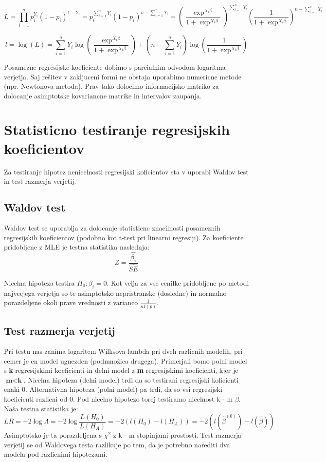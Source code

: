 \documentclass[letterpaper,11pt]{article}
\begin{document}
$$L = \prod_{i=1}^n p_i^{Y_i}(1-p_i)^{1-Y_i}=p_i^{\sum_{i=1}^n Y_i}(1-p_i)^{n-\sum_{i=1}^n Y_i} = 
(\frac{\exp^{X_i \beta}}{1+\exp^{X_i \beta}})^{\sum_{i=1}^n Y_i}(\frac{1}{1+\exp^{X_i \beta}})^{n-\sum_{i=1}^n Y_i}$$

$$l = \log{(L)} = \sum_{i=1}^n Y_i \log{(\frac{\exp^{X_i \beta}}{1+\exp^{X_i \beta}})} + (n-\sum_{i=1}^n Y_i)\log{(\frac{1}{1+\exp^{X_i \beta}})}$$

\noindent Posamezne regresijske koeficiente dobimo s parcialnim odvodom logaritma verjetja. Saj rešitev v zakljuceni formi ne obstaja uporabimo numericne metode (npr. Newtonova metoda). Prav tako dolocimo informacijsko matriko za dolocanje asimptotske kovariancne matrike in intervalov zaupanja.


\section{Statisticno testiranje regresijskih koeficientov}
Za testiranje hipotez nenicelnosti regresijski koficientov sta v uporabi Waldov test in  test razmerja verjetij.

\subsection{Waldov test}
Waldov test se uporablja za dolocanje statisticne znacilnosti posameznih regresijskih koeficientov (podobno kot t-test pri linearni regresiji). Za koeficiente pridobljene z MLE je testna statistika naslednja:
$$Z = \frac{\hat{\beta_i}}{\hat{SE}}$$

\noindent Nicelna hipoteza testira $H_0: \beta_i =0$. Kot velja za vse cenilke pridobljene po metodi najvecjega verjetja so te asimptotsko nepristranske (dosledne) in normalno porazdeljene okoli prave vrednosti z varianco $\frac{1}{nI(p)}$.

\subsection{Test razmerja verjetij}
Pri testu nas zanima logaritem Wilksova lambda pri dveh razlicnih modelih, pri cemer je en model ugnezden (podmnožica drugega). Primerjali bomo polni model s \textbf{k} regresijskimi koeficienti in delni model z \textbf{m} regresijskimi koeficienti, kjer je $\textbf{m} < \textbf{k}$. Nicelna hipoteza (delni model) trdi da so testirani regresijski koficienti enaki 0. Alternativna hipoteza (polni model) pa trdi, da so vsi regresijski koeficienti razlicni od 0. Pod nicelno hipotezo torej testiramo nicelnost k - m $\beta$. Naša testna statistika je:
$$LR = -2 \log{\Lambda} = -2 \log{\frac{L(H_0)}{L(H_A)}} = -2(l(H_0) - l(H_A))=-2(l(\hat{\beta}^{(0)}) - l(\hat{\beta}))$$
Asimptotsko je ta porazdeljena s $\chi^2$ z k - m stopinjami prostosti. Test razmerja verjetij se od Waldovega testa razlikuje po tem, da je potrebno narediti dva modela pod razlicnimi hipotezami.
\end{document}
